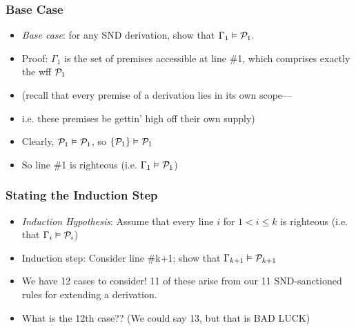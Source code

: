 \begin{frame}
\frametitle{Base Case}

\begin{itemize}[<+->]

\item \emph{Base case}: for any SND derivation, show that $\Gamma_1 \vDash \mathcal{P}_1$.

\item Proof: $\Gamma_1$ is the set of premises accessible at line \#1, which comprises exactly the wff $\mathcal{P}_1$ 

\item (recall that every premise of a derivation lies in its own scope---
\item[] \qquad i.e. these premises be gettin' high off their own supply)

\item Clearly, $\mathcal{P}_1 \vDash \mathcal{P}_1 $, so $\{ \mathcal{P}_1 \} \vDash \mathcal{P}_1$

\item So line \#1 is righteous (i.e. $\Gamma_1 \vDash \mathcal{P}_1$)

\end{itemize}
\end{frame}

\begin{frame}
\frametitle{Stating the Induction Step}

\begin{itemize}[<+->]

\item  \emph{Induction Hypothesis}: Assume that every line $i$ for $1 < i \leq k$ is righteous (i.e. that $\Gamma_i \vDash \mathcal{P}_i $)

\item Induction step: Consider line \#k+1; show that $\Gamma_{k+1} \vDash \mathcal{P}_{k+1}$

\item We have 12 cases to consider! 11 of these arise from our 11 SND-sanctioned rules for extending a derivation. 

\item What is the 12th case?? (We could say 13, but that is BAD LUCK)

\end{itemize}
\end{frame}

